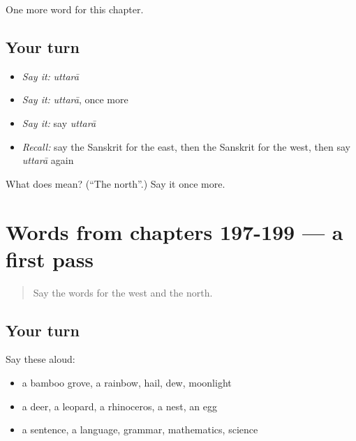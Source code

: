 \begin{grammarlens}[title={What you've built}]
One more word for this chapter.
\end{grammarlens}

\subsection*{Your turn}
\begin{itemize}
\raggedright
  \item \emph{Say it:} \emph{uttarā}
  \item \emph{Say it:} \emph{uttarā}, once more
  \item \emph{Say it:} say \emph{uttarā}
  \item \emph{Recall:} say the Sanskrit for the east, then the Sanskrit for the west, then say \emph{uttarā} again
\end{itemize}

\begin{tcolorbox}[breakable,colback=teal!4,colframe=teal!35!black,title={Before you move on}]
What does  mean? (\textquotedblleft{}The north\textquotedblright{}.) Say it once more.
\end{tcolorbox}
\section[(dialogue)]{Words from chapters 197-199 — a first pass}

\label{lesson:SA-R202-first-pass-words-from-chapters-197-199}



\begin{quote}
Say the words for the west and the north.
\end{quote}

\subsection*{Your turn}
Say these aloud:

\begin{itemize}
\raggedright
  \item a bamboo grove, a rainbow, hail, dew, moonlight
  \item a deer, a leopard, a rhinoceros, a nest, an egg
  \item a sentence, a language, grammar, mathematics, science
\end{itemize}

